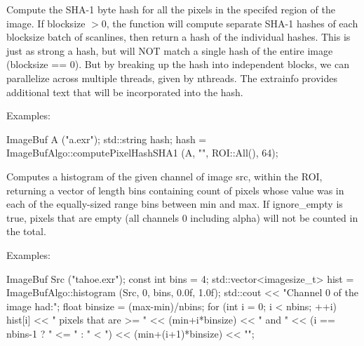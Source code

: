  

Compute the SHA-1 byte hash for all the pixels in the specifed region of
the image.  If {\cf blocksize} $> 0$, the function will compute separate
SHA-1 hashes of each {\cf blocksize} batch of scanlines, then return a
hash of the individual hashes.  This is just as strong a hash, but will
NOT match a single hash of the entire image ({\cf blocksize == 0}).  But
by breaking up the hash into independent blocks, we can parallelize
across multiple threads, given by {\cf nthreads}.
The {\cf extrainfo} provides additional text that will be
incorporated into the hash.

\smallskip
\noindent Examples:
\begin{code}
    ImageBuf A ("a.exr");
    std::string hash;
    hash = ImageBufAlgo::computePixelHashSHA1 (A, "", ROI::All(), 64);
\end{code}
\apiend

 

Computes a histogram of the given {\cf channel} of image {\cf src}, within
the ROI, returning a vector of length {\cf bins} containing count of pixels
whose value was in each of the equally-sized range bins between {\cf min}
and {\cf max}. If {\cf ignore_empty} is {\cf true}, pixels that are empty
(all channels 0 including alpha) will not be counted in the total.

\smallskip
\noindent Examples:
\begin{code}
    ImageBuf Src ("tahoe.exr");
    const int bins = 4;
    std::vector<imagesize_t> hist =
        ImageBufAlgo::histogram (Src, 0, bins, 0.0f, 1.0f);
    std::cout << "Channel 0 of the image had:\n";
    float binsize = (max-min)/nbins;
    for (int i = 0;  i < nbins;  ++i)
        hist[i] << " pixels that are >= " << (min+i*binsize) << " and "
                << (i == nbins-1 ? " <= " : " < ")
                << (min+(i+1)*binsize) << "\n";
\end{code}
\apiend




